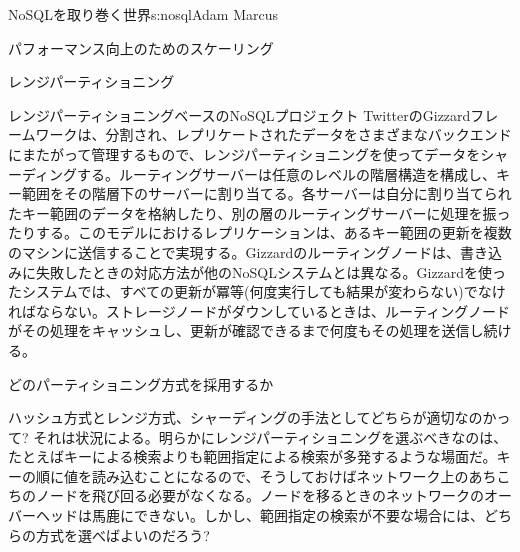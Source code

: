 \begin{aosachapter}{NoSQLを取り巻く世界}{s:nosql}{Adam Marcus}
\begin{aosasect1}{パフォーマンス向上のためのスケーリング}
\begin{aosasect2}{レンジパーティショニング}
\begin{aosasect3}{レンジパーティショニングベースのNoSQLプロジェクト}
TwitterのGizzardフレームワークは、分割され、レプリケートされたデータをさまざまなバックエンドにまたがって管理するもので、レンジパーティショニングを使ってデータをシャーディングする。ルーティングサーバーは任意のレベルの階層構造を構成し、キー範囲をその階層下のサーバーに割り当てる。各サーバーは自分に割り当てられたキー範囲のデータを格納したり、別の層のルーティングサーバーに処理を振ったりする。このモデルにおけるレプリケーションは、あるキー範囲の更新を複数のマシンに送信することで実現する。Gizzardのルーティングノードは、書き込みに失敗したときの対応方法が他のNoSQLシステムとは異なる。Gizzardを使ったシステムでは、すべての更新が冪等(何度実行しても結果が変わらない)でなければならない。ストレージノードがダウンしているときは、ルーティングノードがその処理をキャッシュし、更新が確認できるまで何度もその処理を送信し続ける。

\end{aosasect3}

\end{aosasect2}

\begin{aosasect2}{どのパーティショニング方式を採用するか}

ハッシュ方式とレンジ方式、シャーディングの手法としてどちらが適切なのかって? それは状況による。明らかにレンジパーティショニングを選ぶべきなのは、たとえばキーによる検索よりも範囲指定による検索が多発するような場面だ。キーの順に値を読み込むことになるので、そうしておけばネットワーク上のあちこちのノードを飛び回る必要がなくなる。ノードを移るときのネットワークのオーバーヘッドは馬鹿にできない。しかし、範囲指定の検索が不要な場合には、どちらの方式を選べばよいのだろう?


\end{aosasect2}
\end{aosasect1}
\end{aosachapter}
